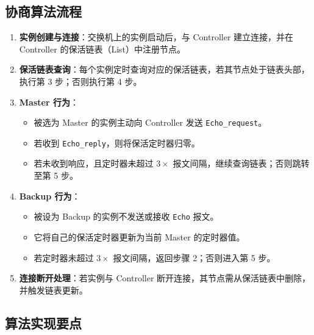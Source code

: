 \documentclass{article}
\begin{document}
\subsection{\textbf{协商算法流程}}

\begin{enumerate}
    \item \textbf{实例创建与连接}：交换机上的实例启动后，与 Controller 建立连接，并在 Controller 的保活链表（List）中注册节点。
    
    \item \textbf{保活链表查询}：每个实例定时查询对应的保活链表，若其节点处于链表头部，执行第 3 步；否则执行第 4 步。
    
    \item \textbf{Master 行为}：
    \begin{itemize}
        \item 被选为 Master 的实例主动向 Controller 发送 \texttt{Echo\_request}。
        \item 若收到 \texttt{Echo\_reply}，则将保活定时器归零。
        \item 若未收到响应，且定时器未超过 $3 \times$ 报文间隔，继续查询链表；否则跳转至第 5 步。
    \end{itemize}
    
    \item \textbf{Backup 行为}：
    \begin{itemize}
        \item 被设为 Backup 的实例不发送或接收 \texttt{Echo} 报文。
        \item 它将自己的保活定时器更新为当前 Master 的定时器值。
        \item 若定时器未超过 $3 \times$ 报文间隔，返回步骤 2；否则进入第 5 步。
    \end{itemize}
    
    \item \textbf{连接断开处理}：若实例与 Controller 断开连接，其节点需从保活链表中删除，并触发链表更新。
\end{enumerate}

\subsection{\textbf{算法实现要点}}
\end{document}
